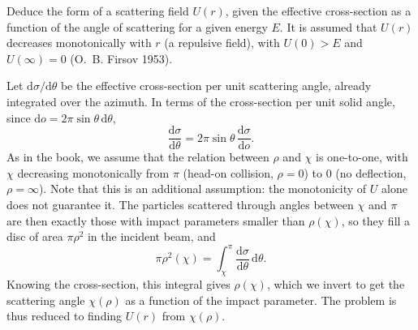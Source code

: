 
\begin{problem}[title={Repulsive field from cross-section (Firsov)}]
{
Deduce the form of a scattering field $U(r)$, given the effective cross-section as a function of the angle of scattering for a given energy $E$. It is assumed that $U(r)$ decreases monotonically with $r$ (a repulsive field), with $U(0) > E$ and $U(\infty) = 0$ (O.~B. Firsov 1953).
}
{
Let $\mathrm{d}\sigma/\mathrm{d}\theta$ be the effective cross-section per unit scattering angle, \ie already integrated over the azimuth. In terms of the cross-section per unit solid angle, since $\mathrm{d}o = 2\pi\sin{\theta}\,\mathrm{d}\theta$,
\begin{equation*}
    \frac{\mathrm{d}\sigma}{\mathrm{d}\theta} = 2\pi\sin{\theta}\,\frac{\mathrm{d}\sigma}{\mathrm{d}o}.
\end{equation*}
As in the book, we assume that the relation between $\rho$ and $\chi$ is one-to-one, with $\chi$ decreasing monotonically from $\pi$ (head-on collision, $\rho = 0$) to $0$ (no deflection, $\rho = \infty$). Note that this is an additional assumption: the monotonicity of $U$ alone does not guarantee it. The particles scattered through angles between $\chi$ and $\pi$ are then exactly those with impact parameters smaller than $\rho(\chi)$, so they fill a disc of area $\pi\rho^2$ in the incident beam, and
\begin{equation*}
    \pi\rho^2(\chi) = \int_\chi^\pi \frac{\mathrm{d}\sigma}{\mathrm{d}\theta}\,\mathrm{d}\theta.
\end{equation*}
Knowing the cross-section, this integral gives $\rho(\chi)$, which we invert to get the scattering angle $\chi(\rho)$ as a function of the impact parameter. The problem is thus reduced to finding $U(r)$ from $\chi(\rho)$.

}
\end{problem}
